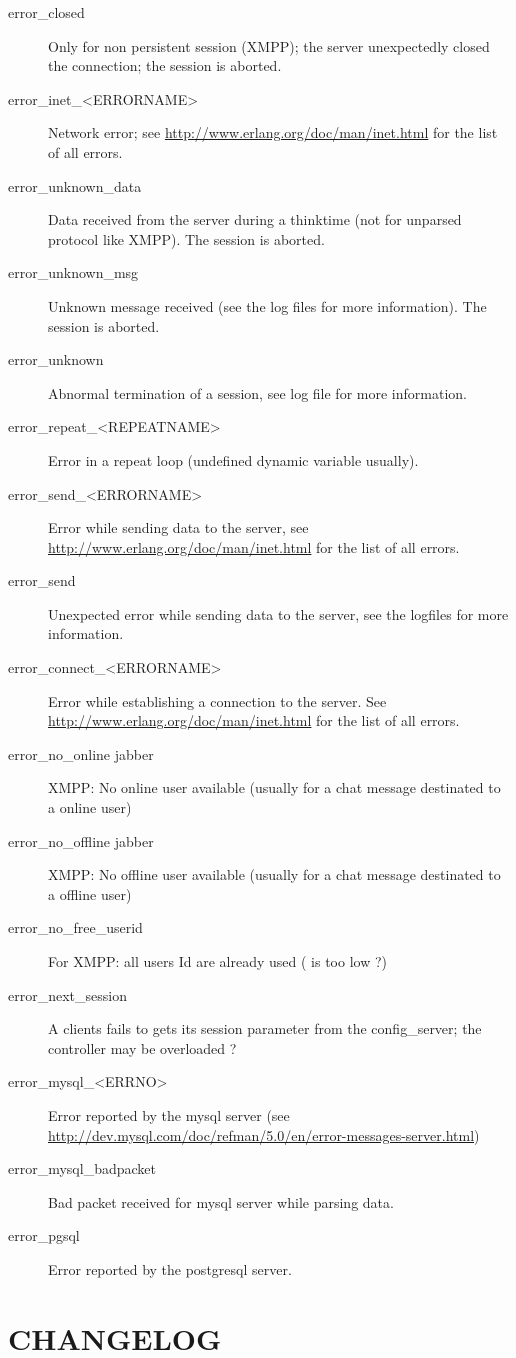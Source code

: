\documentclass{IDXDOC-en}
\begin{document}
\begin{appendix}
\begin{description}
\item[error\_closed] Only for non persistent session (XMPP); the
  server unexpectedly closed the connection; the session is aborted.
\item[error\_inet\_<ERRORNAME>] Network error; see
  \url{http://www.erlang.org/doc/man/inet.html} for the list of all errors.
\item[error\_unknown\_data] Data received from the server during a
  thinktime (not for unparsed protocol like XMPP). The session is
  aborted.
\item[error\_unknown\_msg] Unknown message received (see the log
  files for more information). The session is aborted.
\item[error\_unknown] Abnormal termination of a session, see
  log file for more information.
\item[error\_repeat\_<REPEATNAME>] Error in a repeat loop (undefined
  dynamic variable usually).
\item[error\_send\_<ERRORNAME>] Error while sending data to the
  server, see  \url{http://www.erlang.org/doc/man/inet.html} for the list of all errors.
\item[error\_send] Unexpected error while sending data to the server,
  see the logfiles for more information.
\item[error\_connect\_<ERRORNAME>] Error while establishing a
  connection to the server.  See  \url{http://www.erlang.org/doc/man/inet.html} for the list of all errors.
\item[error\_no\_online jabber] XMPP: No online user available (usually for a
  chat message destinated to a online user)
\item[error\_no\_offline jabber] XMPP: No offline user available (usually for a
  chat message destinated to a offline user)
\item[error\_no\_free\_userid] For XMPP: all users Id are already used
  ( is too low ?)
\item[error\_next\_session] A clients fails to gets its session
  parameter from the config\_server; the controller may be overloaded ?
\item[error\_mysql\_<ERRNO>] Error reported by the mysql server (see \url{http://dev.mysql.com/doc/refman/5.0/en/error-messages-server.html})
\item[error\_mysql\_badpacket] Bad packet received for mysql server while parsing data.
\item[error\_pgsql] Error reported by the postgresql server.
\end{description}

\section{CHANGELOG}
\end{appendix}
\end{document}
